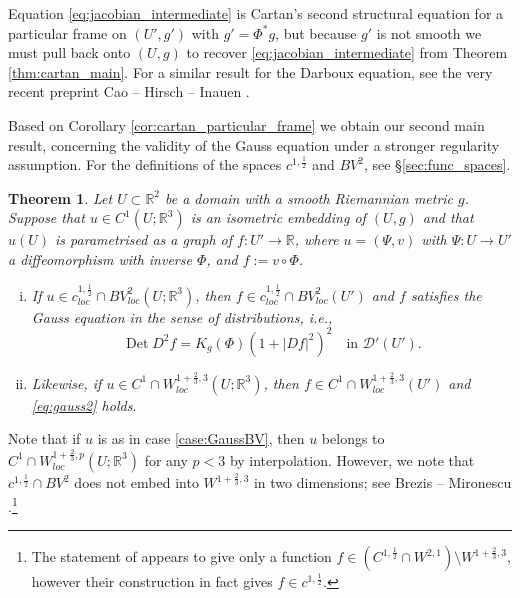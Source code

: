 \documentclass[12pt]{article}
\newcommand{\R}{\mathbb{R}}
\newcommand{\Det}{\operatorname{Det}}
\theoremstyle{plain}
\newtheorem{theorem}{Theorem}[section]
\numberwithin{equation}{section}
\begin{document}
Equation \eqref{eq:jacobian_intermediate} is Cartan's second structural equation for a particular frame on $(U', g')$ with $g' = \Phi^*g$, but because $g'$ is not smooth we must pull back onto $(U,g)$ to recover \eqref{eq:jacobian_intermediate} from Theorem \ref{thm:cartan_main}. For a similar result for the Darboux equation, see the very recent preprint Cao -- Hirsch -- Inauen \cite{cao_hirsch_inauen_Darboux_25}.

Based on Corollary \ref{cor:cartan_particular_frame} we obtain our second main result, concerning the validity of the Gauss equation under a stronger regularity assumption. For the definitions of the spaces $c^{1,\frac12}$ and $BV^2$, see \S \ref{sec:func_spaces}.

\begin{theorem} \label{thm:Gauss_23}
    Let $U \subset \R^2$ be a domain with a smooth Riemannian metric $g$. Suppose that $u \in C^1(U;\R^3)$ is an isometric embedding of $(U,g)$ and that $u(U)$ is parametrised as a graph of $f: U' \to \R$, where $u = (\Psi,v)$ with $\Psi: U \to U'$ a diffeomorphism with inverse $\Phi$, and $f := v \circ \Phi$.
    \begin{enumerate}[(i)]
        \item \label{case:GaussBV} If $u \in c^{1,\frac12}_{loc} \cap BV^2_{loc}(U;\R^3)$, then $f \in c^{1,\frac12}_{loc} \cap BV^2_{loc}(U')$ and $f$ satisfies the Gauss equation in the sense of distributions, i.e.,
        \begin{equation} \label{eq:gauss2}
            \Det D^2 f = K_g(\Phi)(1+|Df|^2)^2 \quad \text{in } \mathcal{D}'(U').
        \end{equation}
        \item \label{case:Gauss23} Likewise, if $u \in C^1 \cap W^{1+\frac23,3}_{loc}(U;\R^3)$, then $f \in C^1 \cap W^{1+\frac23,3}_{loc}(U')$ and \eqref{eq:gauss2} holds.
    \end{enumerate}
\end{theorem}
Note that if $u$ is as in case \eqref{case:GaussBV}, then $u$ belongs to $C^1 \cap W^{1+\frac23,p}_{loc}(U;\R^3)$ for any $p < 3$ by interpolation. However, we note that $c^{1,\frac12} \cap BV^2$ does not embed into $W^{1+\frac23,3}$ in two dimensions; see Brezis -- Mironescu \cite[Theorem 1]{brezis_mironescu_18}.\footnote{The statement of \cite[Theorem 1]{brezis_mironescu_18} appears to give only a function $f \in (C^{1,\frac12} \cap W^{2,1}) \setminus W^{1+\frac23,3}$, however their construction in fact gives $f \in c^{1,\frac12}$.}
\end{document}
